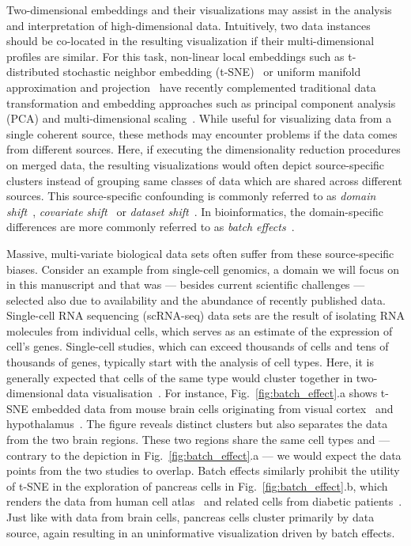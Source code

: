 \documentclass[runningheads]{llncs}
\begin{document}
Two-dimensional embeddings and their visualizations may assist in the analysis
and interpretation of high-dimensional data. Intuitively, two data instances
should be co-located in the resulting visualization if their multi-dimensional
profiles are similar. For this task, non-linear local embeddings such as
t-distributed stochastic neighbor embedding (t-SNE)~\cite{tsne} or uniform
manifold approximation and projection~\cite{umap} have recently complemented
traditional data transformation and embedding approaches such as principal
component analysis (PCA) and multi-dimensional
scaling~\cite{distill,umap_single_cell}. While useful for visualizing data
from a single coherent source, these methods may encounter problems if the data
comes from different sources. Here, if executing the dimensionality reduction
procedures on merged data, the resulting visualizations would often
depict source-specific clusters instead of 
grouping same classes of data which are shared across different
sources. This source-specific confounding is commonly referred to as {\em domain
shift}~\cite{domain_shift}, {\em covariate shift}~\cite{covariate_shift} or
{\em dataset shift}~\cite{dataset_shift}. In bioinformatics, the
domain-specific differences are more commonly referred to as {\em batch
effects}~\cite{cca,mnn,seurat}.

Massive, multi-variate biological data sets often suffer from these source-specific
biases. Consider an example from single-cell genomics, a domain we will focus
on in this manuscript and that was --- besides current scientific challenges
--- selected also due to availability and the abundance of recently published
data. Single-cell RNA sequencing (scRNA-seq) data sets are the result of isolating RNA molecules from individual cells,
which serves as an estimate of the expression of cell's genes.
Single-cell studies, which can exceed thousands of cells and tens of thousands of genes,
typically start with the analysis of cell types. Here, it is generally expected that
cells of the same type would cluster together in two-dimensional data
visualisation~\cite{seurat}. For instance, Fig.~\ref{fig:batch_effect}.a shows
t-SNE embedded data from mouse brain cells originating from visual
cortex~\cite{hrvatin2018} and hypothalamus~\cite{chen2017}. The figure reveals
distinct clusters but also separates the data from the two brain regions. These
two regions share the same cell types and --- contrary to the depiction in
Fig.~\ref{fig:batch_effect}.a --- we would expect the data points from the two
studies to overlap. Batch effects similarly prohibit the utility of t-SNE in
the exploration of pancreas cells in Fig.~\ref{fig:batch_effect}.b, which
renders the data from human cell atlas~\cite{baron2016} and
related cells from diabetic patients~\cite{xin2016}. Just like with data from brain
cells, pancreas cells cluster primarily by data source, again
resulting in an uninformative visualization driven by batch
effects.
\end{document}
